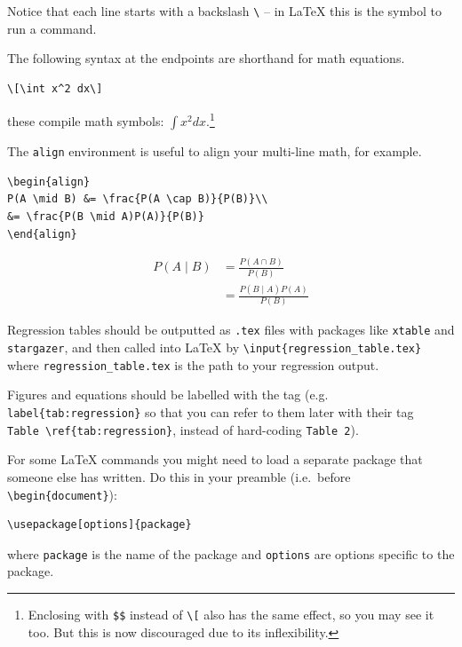 \documentclass[]{book}
\let\rmarkdownfootnote\footnote%
\def\footnote{\protect\rmarkdownfootnote}
\theoremstyle{definition}
\theoremstyle{definition}
\theoremstyle{definition}
\theoremstyle{remark}
\begin{document}
Notice that each line starts with a backslash \texttt{\textbackslash{}}
-- in LaTeX this is the symbol to run a command.

The following syntax at the endpoints are shorthand for math equations.

\begin{verbatim}
\[\int x^2 dx\]
\end{verbatim}

these compile math symbols: \(\displaystyle \int x^2 dx.\)\footnote{Enclosing
  with \texttt{\$\$} instead of \texttt{\textbackslash{}{[}} also has
  the same effect, so you may see it too. But this is now discouraged
  due to its inflexibility.}

The \texttt{align} environment is useful to align your multi-line math,
for example.

\begin{verbatim}
\begin{align}
P(A \mid B) &= \frac{P(A \cap B)}{P(B)}\\
&= \frac{P(B \mid A)P(A)}{P(B)}
\end{align}
\end{verbatim}

\begin{align}
P(A \mid B) &= \frac{P(A \cap B)}{P(B)}\\
&= \frac{P(B \mid A)P(A)}{P(B)}
\end{align}

Regression tables should be outputted as \texttt{.tex} files with
packages like \texttt{xtable} and \texttt{stargazer}, and then called
into LaTeX by \texttt{\textbackslash{}input\{regression\_table.tex\}}
where \texttt{regression\_table.tex} is the path to your regression
output.

Figures and equations should be labelled with the tag (e.g.
\texttt{label\{tab:regression\}} so that you can refer to them later
with their tag \texttt{Table\ \textbackslash{}ref\{tab:regression\}},
instead of hard-coding \texttt{Table\ 2}).

For some LaTeX commands you might need to load a separate package that
someone else has written. Do this in your preamble (i.e.~before
\texttt{\textbackslash{}begin\{document\}}):

\begin{verbatim}
\usepackage[options]{package}
\end{verbatim}

where \texttt{package} is the name of the package and \texttt{options}
are options specific to the package.
\end{document}
